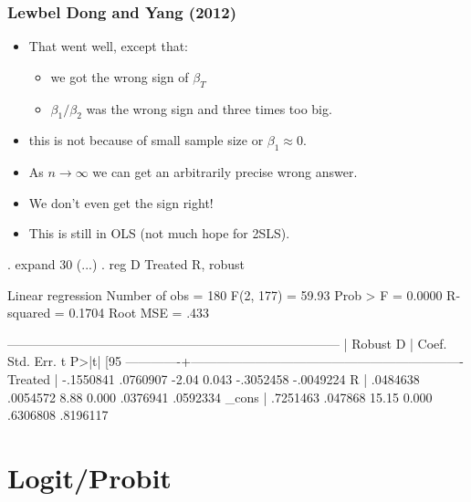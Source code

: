 \begin{frame}[fragile]
\frametitle{Lewbel Dong and Yang (2012)}
\begin{itemize}
\item That went well, except that:
\begin{itemize}
\item we got the wrong sign of $\beta_T$
\item $\beta_1/\beta_2$ was the wrong sign and three times too big.
\end{itemize}
\item this is not because of small sample size or $\beta_1 \approx 0$.
\item As $n \rightarrow \infty$ we can get an arbitrarily precise wrong answer.
\item We don't even get the sign right!
\item This is still in OLS (not much hope for 2SLS).
\end{itemize}
\tiny
\begin{semiverbatim}
. expand 30
(...)
. reg D Treated R, robust

Linear regression                               Number of obs     =        180
                                          F(2, 177)         =      59.93
                                          Prob > F          =     0.0000
                                          R-squared         =     0.1704
                                          Root MSE          =       .433

------------------------------------------------------------------------------
       |               Robust
       D |      Coef.   Std. Err.      t    P>|t|     [95%
-------------+----------------------------------------------------------------
Treated |  -.1550841   .0760907    -2.04   0.043    -.3052458   -.0049224
       R |   .0484638   .0054572     8.88   0.000     .0376941    .0592334
_cons |   .7251463    .047868    15.15   0.000     .6306808    .8196117
\end{semiverbatim}
\end{frame}

\section{Logit/Probit}


